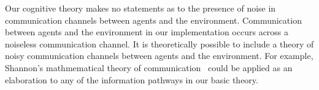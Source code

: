 Our cognitive theory makes no statements as to the presence of noise
in communication channels between agents and the environment.
Communication between agents and the environment in our implementation
occurs across a noiseless communication channel.  It is theoretically
possible to include a theory of noisy communication channels between
agents and the environment.  For example, Shannon's mathmematical
theory of communication~\citep{shannon:1959} could be applied as an
elaboration to any of the information pathways in our basic theory.



